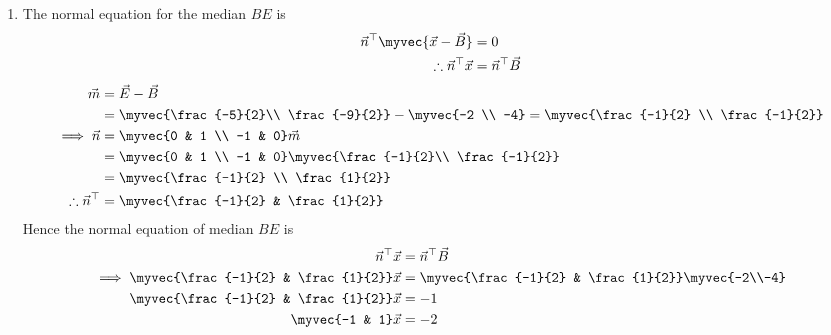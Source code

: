 \documentclass[11pt]{book}
\begin{document}
\begin{enumerate}[label=\thesection.\arabic*.,ref=\thesection.\theenumi]
\begin{enumerate}
\item The normal equation for the median $BE$ is
        \begin{align}
        \vec{n}^{\top}\myvec{\vec{x}-\vec{B}} &= 0\\
         \therefore \vec{n}^{\top}\vec{x} &=  \vec{n}^{\top}\vec{B}
        \end{align}
\begin{align}
	\vec{m} &= \vec{E}- \vec{B} \\
&=\myvec{\frac{-5}{2}\\ \frac{-9}{2}} - \myvec{-2 \\ -4}
	 =\myvec{\frac{-1}{2} \\ \frac{-1}{2}}\\
 	\implies  \vec{n} &=\myvec{0 & 1 \\ -1 & 0} \vec{m}\\
  &= \myvec{0 & 1 \\ -1 & 0} \myvec{\frac{-1}{2}\\ \frac{-1}{2}}\\
  &= \myvec{\frac{-1}{2} \\ \frac{1}{2}}\\
  \therefore \vec{n}^{\top} &= \myvec{\frac{-1}{2} & \frac{1}{2}}
\end{align}
Hence the normal equation of median $BE$ is 
\begin{align}
\vec{n}^{\top}\vec{x} &= \vec{n}^{\top}\vec{B}\\
\implies \myvec{\frac{-1}{2} & \frac{1}{2}}\vec{x} &= \myvec{\frac{-1}{2} & \frac{1}{2}}\myvec{-2\\-4}\\
   \myvec{\frac{-1}{2} & \frac{1}{2}}\vec{x} &= -1\\
	\myvec{-1 & 1}\vec{x} &= -2
\end{align}


\end{enumerate}
\end{enumerate}
\end{document}

